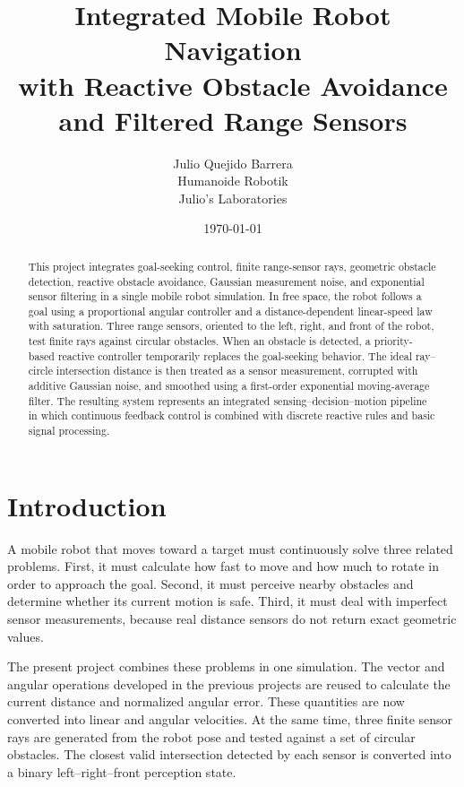 \documentclass[10pt,twocolumn,a4paper]{article}
\title{
    \textbf{Integrated Mobile Robot Navigation\\
    with Reactive Obstacle Avoidance\\
    and Filtered Range Sensors}
}
\author{
    Julio Quejido Barrera\\
    Humanoide Robotik\\
    Julio's Laboratories
}
\date{\today}
\begin{document}

\maketitle

\begin{abstract}
This project integrates goal-seeking control, finite range-sensor rays,
geometric obstacle detection, reactive obstacle avoidance, Gaussian
measurement noise, and exponential sensor filtering in a single mobile
robot simulation. In free space, the robot follows a goal using a
proportional angular controller and a distance-dependent linear-speed
law with saturation. Three range sensors, oriented to the left, right,
and front of the robot, test finite rays against circular obstacles.
When an obstacle is detected, a priority-based reactive controller
temporarily replaces the goal-seeking behavior. The ideal ray--circle
intersection distance is then treated as a sensor measurement, corrupted
with additive Gaussian noise, and smoothed using a first-order
exponential moving-average filter. The resulting system represents an
integrated sensing--decision--motion pipeline in which continuous
feedback control is combined with discrete reactive rules and basic
signal processing.
\end{abstract}

\section{Introduction}

A mobile robot that moves toward a target must continuously solve three
related problems. First, it must calculate how fast to move and how much
to rotate in order to approach the goal. Second, it must perceive nearby
obstacles and determine whether its current motion is safe. Third, it
must deal with imperfect sensor measurements, because real distance
sensors do not return exact geometric values.

The present project combines these problems in one simulation. The
vector and angular operations developed in the previous projects are
reused to calculate the current distance and normalized angular error.
These quantities are now converted into linear and angular velocities.
At the same time, three finite sensor rays are generated from the robot
pose and tested against a set of circular obstacles. The closest valid
intersection detected by each sensor is converted into a binary
left--right--front perception state.
\end{document}
